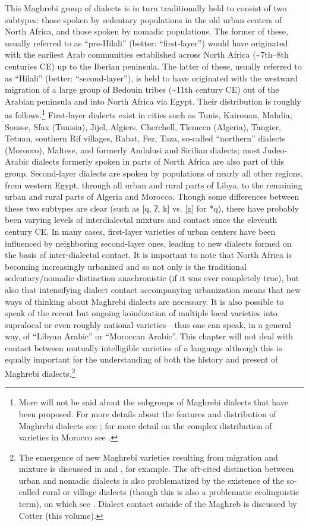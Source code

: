 \documentclass[output=paper]{langsci/langscibook}
\begin{document}
This Maghrebi group of dialects is in turn traditionally held to consist of two subtypes: those spoken by sedentary populations in the old urban centers of North Africa, and those spoken by nomadic populations. The former of these, usually referred to as “pre-Hilali” (better: “first-layer”) would have originated with the earliest Arab communities established across North Africa ({\textasciitilde}7th--8th centuries CE) up to the Iberian peninsula. The latter of these, usually referred to as “Hilali” (better: “second-layer”), is held to have originated with the westward migration of a large group of Bedouin tribes ({\textasciitilde}11th century CE) out of the Arabian peninsula and into North Africa via Egypt. Their distribution is roughly as follows.\footnote{More will not be said about the subgroups of Maghrebi dialects that have been proposed. For more details about the features and distribution of Maghrebi dialects see \citet{Pereira2011}; for more detail on the complex distribution of varieties in Morocco see \citet{Heath2002}.} First-layer dialects exist in cities such as Tunis, Kairouan, Mahdia, Sousse, Sfax (Tunisia), Jijel, Algiers, Cherchell, Tlemcen (Algeria), Tangier, Tetuan, southern Rif villages, Rabat, Fez, Taza, so-called “northern” dialects (Morocco), Maltese, and formerly Andalusi and Sicilian dialects; most Judeo-Arabic dialects formerly spoken in parts of North Africa are also part of this group. Second-layer dialects are spoken by populations of nearly all other regions, from western Egypt, through all urban and rural parts of Libya, to the remaining urban and rural parts of Algeria and Morocco. Though some differences between these two subtypes are clear (such as [q, ʔ, k] vs. [g] for *q), there have probably been varying levels of interdialectal mixture and contact since the eleventh century CE. In many cases, first-layer varieties of urban centers have been influenced by neighboring second-layer ones, leading to new dialects formed on the basis of inter-dialectal contact. It is important to note that North Africa is becoming increasingly urbanized and so not only is the traditional sedentary/nomadic distinction anachronistic (if it was ever completely true), but also that intensifying dialect contact accompanying urbanization means that new ways of thinking about Maghrebi dialects are necessary. It is also possible to speak of the recent but ongoing koinéization of multiple local varieties into supralocal or even roughly national varieties—thus one can speak, in a general way, of “Libyan Arabic” or “Moroccan Arabic”. This chapter will not deal with contact between mutually intelligible varieties of a language although this is equally important for the understanding of both the history and present of Maghrebi dialects.\footnote{The emergence of new Maghrebi varieties resulting from migration and mixture is discussed in \citet{Pereira2007} and \citet{Gibson2002}, for example. The oft-cited distinction between urban and nomadic dialects is also problematized by the existence of the so-called rural or village dialects (though this is also a problematic ecolinguistic term), on which see \citet{Mion2015}. Dialect contact outside of the Maghreb is discussed by Cotter (this volume).}
\end{document}
